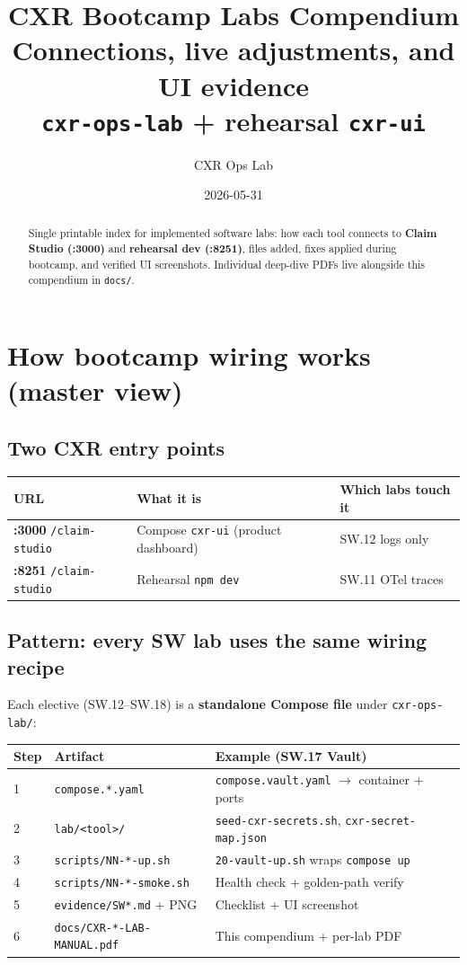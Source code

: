 \documentclass[11pt,a4paper]{report}
\title{CXR Bootcamp Labs Compendium\\
\large Connections, live adjustments, and UI evidence\\
\large \texttt{cxr-ops-lab} + rehearsal \texttt{cxr-ui}}
\author{CXR Ops Lab}
\date{2026-05-31}
\begin{document}
\maketitle
\begin{abstract}
Single printable index for implemented software labs: how each tool connects to
\textbf{Claim Studio (:3000)} and \textbf{rehearsal dev (:8251)}, files added, fixes applied during bootcamp,
and verified UI screenshots. Individual deep-dive PDFs live alongside this compendium in \texttt{docs/}.
\end{abstract}
\tableofcontents
\newpage

\chapter{How bootcamp wiring works (master view)}

\section{Two CXR entry points}

\begin{center}
\begin{tabular}{lll}
\toprule
URL & What it is & Which labs touch it \\
\midrule
\textbf{:3000} \texttt{/claim-studio} & Compose \texttt{cxr-ui} (product dashboard) & SW.12 logs only \\
\textbf{:8251} \texttt{/claim-studio} & Rehearsal \texttt{npm dev} & SW.11 OTel traces \\
\bottomrule
\end{tabular}
\end{center}

\section{Pattern: every SW lab uses the same wiring recipe}

Each elective (SW.12--SW.18) is a \textbf{standalone Compose file} under \texttt{cxr-ops-lab/}:

\begin{center}
\begin{tabular}{llll}
\toprule
Step & Artifact & Example (SW.17 Vault) \\
\midrule
1 & \texttt{compose.*.yaml} & \texttt{compose.vault.yaml} $\rightarrow$ container + ports \\
2 & \texttt{lab/<tool>/} & \texttt{seed-cxr-secrets.sh}, \texttt{cxr-secret-map.json} \\
3 & \texttt{scripts/NN-*-up.sh} & \texttt{20-vault-up.sh} wraps \texttt{compose up} \\
4 & \texttt{scripts/NN-*-smoke.sh} & Health check + golden-path verify \\
5 & \texttt{evidence/SW*.md} + PNG & Checklist + UI screenshot \\
6 & \texttt{docs/CXR-*-LAB-MANUAL.pdf} & This compendium + per-lab PDF \\
\bottomrule
\end{tabular}
\end{center}
\end{document}
